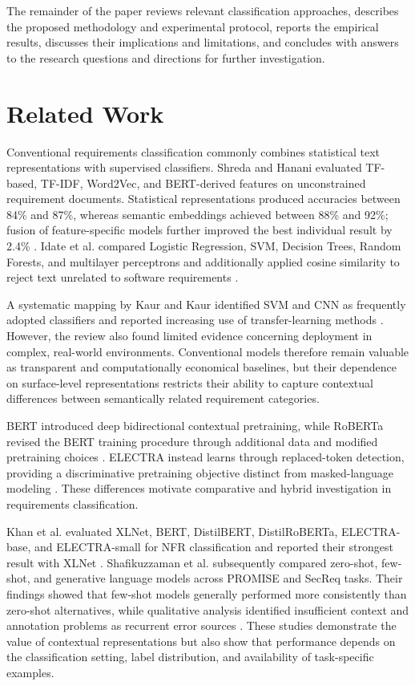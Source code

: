 \documentclass[runningheads]{llncs}
\begin{document}
The remainder of the paper reviews relevant classification approaches, describes the proposed methodology and experimental protocol, reports the empirical results, discusses their implications and limitations, and concludes with answers to the research questions and directions for further investigation.

\section{Related Work}\label{sec:related-work}
 

Conventional requirements classification commonly combines statistical text representations with supervised classifiers. Shreda and Hanani evaluated TF-based, TF-IDF, Word2Vec, and BERT-derived features on unconstrained requirement documents. Statistical representations produced accuracies between 84\% and 87\%, whereas semantic embeddings achieved between 88\% and 92\%; fusion of feature-specific models further improved the best individual result by 2.4\% \cite{shreda_nfr_nlp}. Idate et al. compared Logistic Regression, SVM, Decision Trees, Random Forests, and multilayer perceptrons and additionally applied cosine similarity to reject text unrelated to software requirements \cite{idate_ml_requirements}.

A systematic mapping by Kaur and Kaur identified SVM and CNN as frequently adopted classifiers and reported increasing use of transfer-learning methods \cite{kaur_ai_requirements}. However, the review also found limited evidence concerning deployment in complex, real-world environments. Conventional models therefore remain valuable as transparent and computationally economical baselines, but their dependence on surface-level representations restricts their ability to capture contextual differences between semantically related requirement categories.
 

BERT introduced deep bidirectional contextual pretraining, while RoBERTa revised the BERT training procedure through additional data and modified pretraining choices \cite{devlin_bert,liu_roberta}. ELECTRA instead learns through replaced-token detection, providing a discriminative pretraining objective distinct from masked-language modeling \cite{clark_electra}. These differences motivate comparative and hybrid investigation in requirements classification.

Khan et al. evaluated XLNet, BERT, DistilBERT, DistilRoBERTa, ELECTRA-base, and ELECTRA-small for NFR classification and reported their strongest result with XLNet \cite{khan_transfer_requirements}. Shafikuzzaman et al. subsequently compared zero-shot, few-shot, and generative language models across PROMISE and SecReq tasks. Their findings showed that few-shot models generally performed more consistently than zero-shot alternatives, while qualitative analysis identified insufficient context and annotation problems as recurrent error sources \cite{shafikuzzaman_fewshot_requirements}. These studies demonstrate the value of contextual representations but also show that performance depends on the classification setting, label distribution, and availability of task-specific examples.
 
\end{document}
